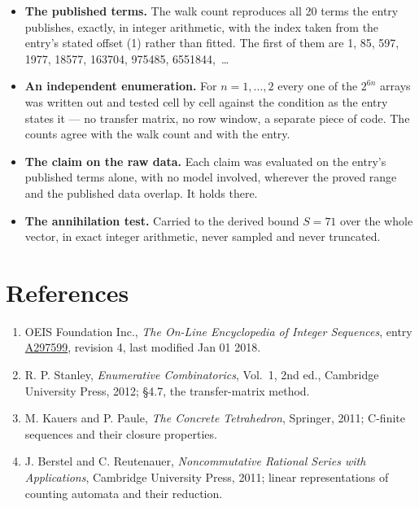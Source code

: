 \documentclass[11pt]{article}
\theoremstyle{definition}
\begin{document}
\begin{itemize}

\item {\bfseries The published terms.} The walk count reproduces all 20 terms the entry publishes, exactly, in integer arithmetic, with the index taken from the entry's stated offset (1) rather than fitted. The first of them are 1, 85, 597, 1977, 18577, 163704, 975485, 6551844,~\dots

\item {\bfseries An independent enumeration.} For $n = 1,\dots,2$ every one of the $2^{6n}$ arrays was written out and tested cell by cell against the condition as the entry states it --- no transfer matrix, no row window, a separate piece of code. The counts agree with the walk count and with the entry.

\item {\bfseries The claim on the raw data.} Each claim was evaluated on the entry's published terms alone, with no model involved, wherever the proved range and the published data overlap. It holds there.

\item {\bfseries The annihilation test.} Carried to the derived bound $S = 71$ over the whole vector, in exact integer arithmetic, never sampled and never truncated.

\end{itemize}

\section{References}

\begin{enumerate}

\item OEIS Foundation Inc., \emph{The On-Line Encyclopedia of Integer Sequences}, entry \href{https://oeis.org/A297599}{A297599}, revision 4, last modified Jan 01 2018.

\item R. P. Stanley, \emph{Enumerative Combinatorics}, Vol.~1, 2nd ed., Cambridge University Press, 2012; \S4.7, the transfer-matrix method.

\item M. Kauers and P. Paule, \emph{The Concrete Tetrahedron}, Springer, 2011; C-finite sequences and their closure properties.

\item J. Berstel and C. Reutenauer, \emph{Noncommutative Rational Series with Applications}, Cambridge University Press, 2011; linear representations of counting automata and their reduction.

\end{enumerate}
\end{document}
